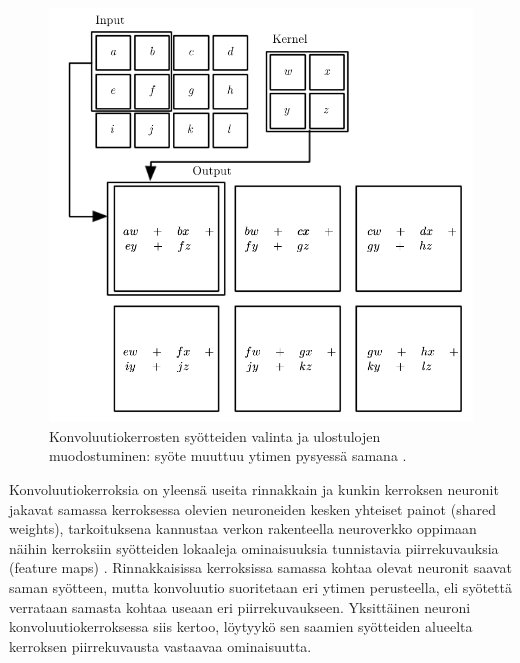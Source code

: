 \documentclass[finnish]{tktltiki2}
\theoremstyle{definition}
\theoremstyle{remark}
\begin{document}
    \begin{figure}[h]
      \centering
      \includegraphics[scale=0.4]{convolution}
      \caption{Konvoluutiokerrosten syötteiden valinta ja ulostulojen muodostuminen: syöte muuttuu ytimen pysyessä samana \cite{Goodfellow-et-al-2016}.}
      \label{pic:convolution}
    \end{figure}
    
    Konvoluutiokerroksia on yleensä useita rinnakkain ja kunkin kerroksen neuronit jakavat samassa kerroksessa olevien neuroneiden kesken yhteiset painot (shared weights), tarkoituksena kannustaa verkon rakenteella neuroverkko oppimaan näihin kerroksiin syötteiden lokaaleja ominaisuuksia tunnistavia piirrekuvauksia (feature maps) \cite{lecun-et-al-98-convnets}. Rinnakkaisissa kerroksissa samassa kohtaa olevat neuronit saavat saman syötteen, mutta konvoluutio suoritetaan eri ytimen perusteella, eli syötettä verrataan samasta kohtaa useaan eri piirrekuvaukseen. Yksittäinen neuroni konvoluutiokerroksessa siis kertoo, löytyykö sen saamien syötteiden alueelta kerroksen piirrekuvausta vastaavaa ominaisuutta.
    
\end{document}
